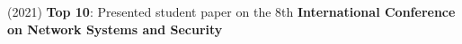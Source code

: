 (2021) \textbf{Top 10}{: Presented student paper on the 8th \textbf{International Conference on Network Systems and Security}} \\